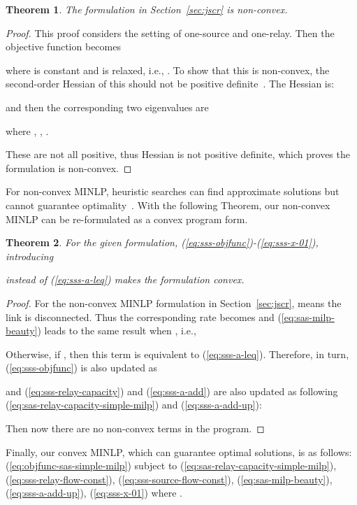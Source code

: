 \documentclass[conference]{IEEEtran}
\begin{document}
\newtheorem{thm}{Theorem}
\begin{thm}
The formulation in Section~\ref{sec:jscr} is non-convex.
\end{thm}
\begin{proof}
This proof considers the setting of one-source and one-relay. Then the objective function becomes


where  is constant and  is relaxed, i.e., .
To show that this is non-convex, the second-order Hessian of this should not be positive definite~\cite{boydbook}.
The Hessian  is:

and then the corresponding two eigenvalues are

where , , .

These are not all positive, thus Hessian is not positive definite, which proves the formulation is non-convex.
\end{proof}

For non-convex MINLP, heuristic searches can find approximate solutions but cannot guarantee optimality~\cite{boydbook}.
With the following Theorem, our non-convex MINLP can be re-formulated as a convex program form.

\begin{thm}
For the given formulation, (\ref{eq:sss-objfunc})-(\ref{eq:sss-x-01}), introducing

instead of (\ref{eq:sss-a-leq}) makes the formulation convex.
\end{thm}
\begin{proof}
For the non-convex MINLP formulation in Section~\ref{sec:jscr},  means the link is disconnected. Thus the corresponding rate becomes  and (\ref{eq:sas-milp-beauty}) leads to the same result when , i.e.,

Otherwise, if , then this term is equivalent to (\ref{eq:sss-a-leq}).
Therefore, in turn, (\ref{eq:sss-objfunc}) is also updated as

and (\ref{eq:sss-relay-capacity}) and (\ref{eq:sss-a-add}) are also updated as following (\ref{eq:sas-relay-capacity-simple-milp}) and (\ref{eq:sss-a-add-up}):

Then now there are no non-convex terms in the program.
\end{proof}

Finally, our convex MINLP, which can guarantee optimal solutions, is as follows: (\ref{eq:objfunc-sas-simple-milp}) subject to
(\ref{eq:sas-relay-capacity-simple-milp}),
(\ref{eq:sss-relay-flow-const}),
(\ref{eq:sss-source-flow-const}),
(\ref{eq:sas-milp-beauty}),
(\ref{eq:sss-a-add-up}),
(\ref{eq:sss-x-01})
where .
\end{document}
